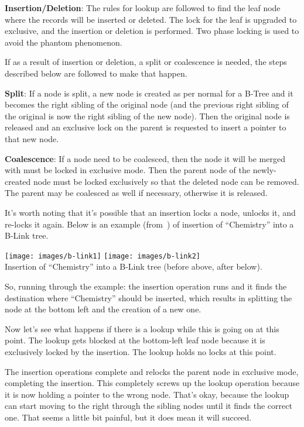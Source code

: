 \documentclass[a4paper]{report}
\begin{document}
\textbf{Insertion/Deletion}: The rules for lookup are followed to find the leaf node where the records will be inserted or deleted. The lock for the leaf is upgraded to exclusive, and the insertion or deletion is performed. Two phase locking is used to avoid the phantom phenomenon.

If as a result of insertion or deletion, a split or coalescence is needed, the steps described below are followed to make that happen.

\textbf{Split}: If a node is split, a new node is created as per normal for a B-Tree and it becomes the right sibling of the original node (and the previous right sibling of the original is now the right sibling of the new node). Then the original node is released and an exclusive lock on the parent is requested to insert a pointer to that new node.

\textbf{Coalescence}: If a node need to be coalesced, then the node it will be merged with must be locked in exclusive mode. Then the parent node of the newly-created node must be locked exclusively so that the deleted node can be removed. The parent may be coalesced as well if necessary, otherwise it is released.

It's worth noting that it's possible that an insertion locks a node, unlocks it, and re-locks it again.  Below is an example (from~\cite{dsc}) of insertion of ``Chemistry'' into a B-Link tree. 

\begin{center}
	\texttt{[image: images/b-link1]}
	\texttt{[image: images/b-link2]}\\
	Insertion of ``Chemistry'' into a B-Link tree (before above, after below).~\cite{dsc}
\end{center}

So, running through the example: the insertion operation runs and it finds the destination where ``Chemistry'' should be inserted, which results in splitting the node  at the bottom left and the creation of a new one.  

Now let's see what happens if there is a lookup while this is going on at this point. The lookup gets blocked at the bottom-left leaf node because it is exclusively locked by the insertion. The lookup holds no locks at this point.

The insertion operations complete and relocks the parent node in exclusive mode, completing the insertion. This completely screws up the lookup operation because it is now holding a pointer to the wrong node. That's okay, because the lookup can start moving to the right through the sibling nodes until it finds the correct one. That seems a little bit painful, but it does mean it will succeed.
\end{document}
